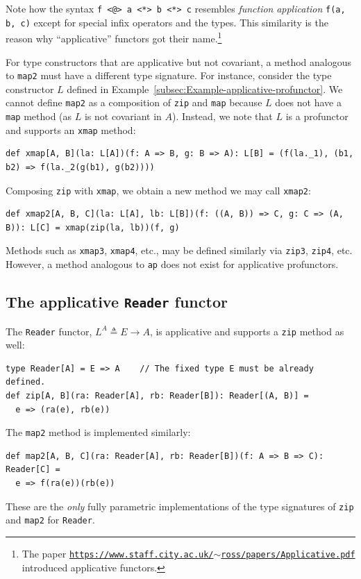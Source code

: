 Note how the syntax \lstinline!f <@> a <*> b <*> c! resembles \emph{function}
\emph{application} \lstinline!f(a, b, c)! except for special infix
operators and the types. This similarity is the reason why \textsf{``}applicative\textsf{''}
functors got their name.\footnote{The paper \texttt{\href{https://www.staff.city.ac.uk/~ross/papers/Applicative.pdf}{https://www.staff.city.ac.uk/$\sim$ross/papers/Applicative.pdf}}
introduced applicative functors.}

For type constructors that are applicative but not covariant, a method
analogous to \lstinline!map2! must have a different type signature.
For instance, consider the type constructor $L$ defined in Example~\ref{subsec:Example-applicative-profunctor}.
We cannot define \lstinline!map2! as a composition of \lstinline!zip!
and \lstinline!map! because $L$ does not have a \lstinline!map!
method (as $L$ is not covariant in $A$). Instead, we note that $L$
is a profunctor and supports an \lstinline!xmap!
method:
\begin{lstlisting}
def xmap[A, B](la: L[A])(f: A => B, g: B => A): L[B] = (f(la._1), (b1, b2) => f(la._2(g(b1), g(b2))))
\end{lstlisting}
Composing \lstinline!zip! with \lstinline!xmap!, we obtain a new
method we may call \lstinline!xmap2!:
\begin{lstlisting}
def xmap2[A, B, C](la: L[A], lb: L[B])(f: ((A, B)) => C, g: C => (A, B)): L[C] = xmap(zip(la, lb))(f, g)
\end{lstlisting}
Methods such as \lstinline!xmap3!, \lstinline!xmap4!, etc., may
be defined similarly via \lstinline!zip3!, \lstinline!zip4!, etc.
However, a method analogous to \lstinline!ap! does not exist for
applicative profunctors.

\subsection{The applicative \texttt{Reader} functor\label{subsec:The-applicative-Reader-functor}}

The \lstinline!Reader! functor, $L^{A}\triangleq E\rightarrow A$,
is applicative and supports a \lstinline!zip! method as well:
\begin{lstlisting}
type Reader[A] = E => A    // The fixed type E must be already defined.
def zip[A, B](ra: Reader[A], rb: Reader[B]): Reader[(A, B)] =
  e => (ra(e), rb(e))
\end{lstlisting}
The \lstinline!map2! method is implemented similarly:
\begin{lstlisting}
def map2[A, B, C](ra: Reader[A], rb: Reader[B])(f: A => B => C): Reader[C] =
  e => f(ra(e))(rb(e))
\end{lstlisting}
These are the \emph{only} fully parametric implementations of the
type signatures of \lstinline!zip! and \lstinline!map2! for \lstinline!Reader!.

